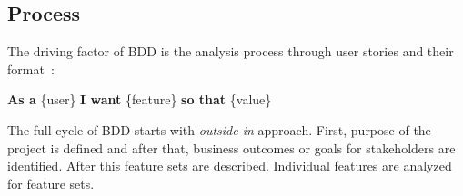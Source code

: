     \subsection{Process}
    The driving factor of BDD is the analysis process through user stories and their format~\cite{wiki:story}:\newline\
    \begin{addmargin}[2em]{2em}
    \textbf{As a} \{user\}\newline
    \textbf{I want} \{feature\}\newline
    \textbf{so that} \{value\}\newline
    \end{addmargin}
    The full cycle of BDD starts with \textit{outside-in} approach. First, purpose of the project is defined and after that,
    business outcomes or goals for stakeholders are identified. After this feature sets are described.
    Individual features are analyzed for feature sets.~\cite{chelimsky2010rspec}

